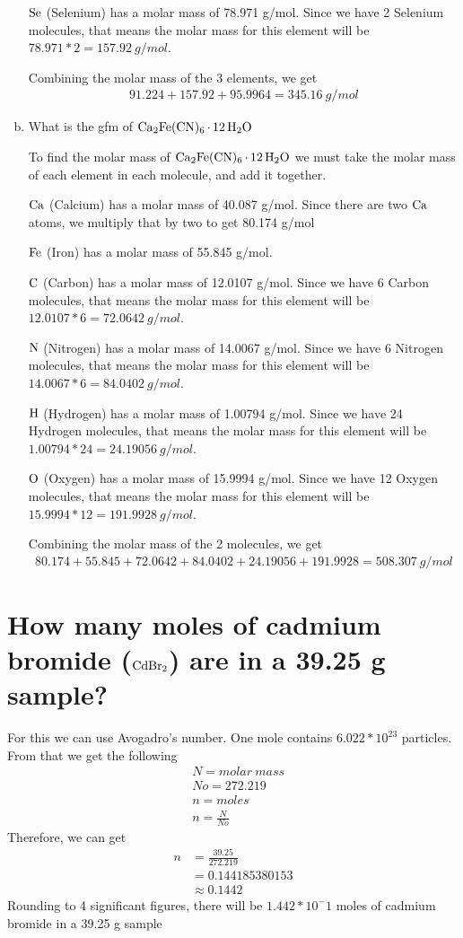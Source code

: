 \documentclass[11pt]{article}
\begin{document}
\begin{enumerate}[(a)]
\(\ce{Se}\) (Selenium) has a molar mass of 78.971 g/mol. Since we have 2
Selenium molecules, that means the molar mass for this element will be
\(78.971*2=157.92\ g/mol\).

Combining the molar mass of the 3 elements, we get
\begin{align*}
91.224+157.92+95.9964=345.16\ g/mol
\end{align*}

\item What is the gfm of \(\ce{Ca2Fe(CN)6*12H2O}\)

 To find the molar mass of \(\ce{Ca2Fe(CN)6*12H2O}\) we must take the molar
mass of each element in each molecule, and add it together.

\(\ce{Ca}\) (Calcium) has a molar mass of 40.087 g/mol. Since there are two
  \(\ce{Ca}\) atoms, we multiply that by two to get 80.174 g/mol

\(\ce{Fe}\) (Iron) has a molar mass of 55.845 g/mol.

\(\ce{C}\) (Carbon) has a molar mass of 12.0107 g/mol. Since we have 6
Carbon molecules, that means the molar mass for this element will be
\(12.0107*6=72.0642\ g/mol\).

\(\ce{N}\) (Nitrogen) has a molar mass of 14.0067 g/mol. Since we have 6
Nitrogen molecules, that means the molar mass for this element will be
\(14.0067*6=84.0402\ g/mol\).

\(\ce{H}\) (Hydrogen) has a molar mass of 1.00794 g/mol. Since we have 24
Hydrogen molecules, that means the molar mass for this element will be
\(1.00794*24=24.19056\ g/mol\).

\(\ce{O}\) (Oxygen) has a molar mass of 15.9994 g/mol. Since we have 12
Oxygen molecules, that means the molar mass for this element will be
\(15.9994*12=191.9928\ g/mol\).

Combining the molar mass of the 2 molecules, we get
\begin{align*}
80.174+55.845+72.0642+84.0402+24.19056+191.9928=508.307\ g/mol
\end{align*}
\end{enumerate}

\section{How many moles of cadmium bromide (\(\ce{CdBr2}\)) are in a 39.25 g sample?}
\label{sec:org0a784a0}
For this we can use Avogadro's number. One mole contains \(6.022*10^{23}\) particles. From that we get the following
\begin{align*}
&N = molar\ mass\\
&No = 272.219\\
&n = moles\\
&n=\frac{N}{No}
\end{align*}
Therefore, we can get
\begin{align*}
n&= \frac{39.25}{272.219}\\
&=0.144185380153\\
&\approx0.1442
\end{align*}
Rounding to 4 significant figures, there will be \(1.442*10^-1\) moles of cadmium bromide in a 39.25 g sample
\end{document}
